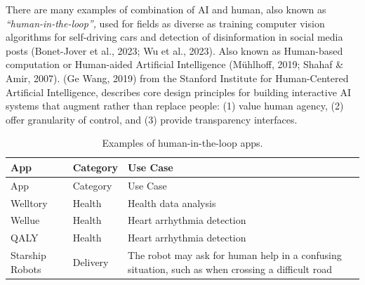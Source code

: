 \documentclass[
  letterpaper,
  DIV=11,
  numbers=noendperiod]{scrartcl}
\begin{document}
There are many examples of combination of AI and human, also known as
\emph{``human-in-the-loop'',} used for fields as diverse as training
computer vision algorithms for self-driving cars and detection of
disinformation in social media posts (Bonet-Jover et al., 2023; Wu et
al., 2023). Also known as Human-based computation or Human-aided
Artificial Intelligence (Mühlhoff, 2019; Shahaf \& Amir, 2007). (Ge
Wang, 2019) from the Stanford Institute for Human-Centered Artificial
Intelligence, describes core design principles for building interactive
AI systems that augment rather than replace people: (1) value human
agency, (2) offer granularity of control, and (3) provide transparency
interfaces.

\begin{longtable}[]{@{}
  >{\raggedright\arraybackslash}p{}
  >{\raggedright\arraybackslash}p{}
  >{\raggedright\arraybackslash}p{}@{}}
\caption{Examples of human-in-the-loop apps.}\tabularnewline
\toprule\noalign{}
\begin{minipage}[b]{\linewidth}\raggedright
App
\end{minipage} & \begin{minipage}[b]{\linewidth}\raggedright
Category
\end{minipage} & \begin{minipage}[b]{\linewidth}\raggedright
Use Case
\end{minipage} \\
\midrule\noalign{}
\endfirsthead
\toprule\noalign{}
\begin{minipage}[b]{\linewidth}\raggedright
App
\end{minipage} & \begin{minipage}[b]{\linewidth}\raggedright
Category
\end{minipage} & \begin{minipage}[b]{\linewidth}\raggedright
Use Case
\end{minipage} \\
\midrule\noalign{}
\endhead
\bottomrule\noalign{}
\endlastfoot
Welltory & Health & Health data analysis \\
Wellue & Health & Heart arrhythmia detection \\
QALY & Health & Heart arrhythmia detection \\
Starship Robots & Delivery & The robot may ask for human help in a
confusing situation, such as when crossing a difficult road \\
\end{longtable}
\end{document}
